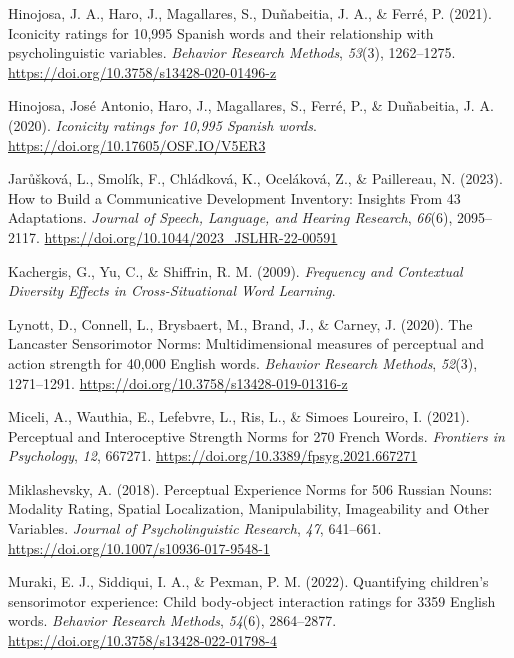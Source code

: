 \documentclass[
  man,floatsintext]{apa6}
\newlength{\cslhangindent}
\newlength{\cslentryspacingunit} %
\newenvironment{CSLReferences}[2] %
 {%
  \setlength{\parindent}{0pt}
  \ifodd #1
  \let\oldpar\par
  \def\par{\hangindent=\cslhangindent\oldpar}
  \fi
  \setlength{\parskip}{#2\cslentryspacingunit}
 }%
 {}
\begin{document}
\begin{CSLReferences}{1}{0}
\leavevmode{}%
Hinojosa, J. A., Haro, J., Magallares, S., Duñabeitia, J. A., \& Ferré, P. (2021). Iconicity ratings for 10,995 {Spanish} words and their relationship with psycholinguistic variables. \emph{Behavior Research Methods}, \emph{53}(3), 1262--1275. \url{https://doi.org/10.3758/s13428-020-01496-z}

\leavevmode{}%
Hinojosa, José Antonio, Haro, J., Magallares, S., Ferré, P., \& Duñabeitia, J. A. (2020). \emph{Iconicity ratings for 10,995 {Spanish} words}. \url{https://doi.org/10.17605/OSF.IO/V5ER3}

\leavevmode{}%
Jarůšková, L., Smolík, F., Chládková, K., Oceláková, Z., \& Paillereau, N. (2023). How to {Build} a {Communicative Development Inventory}: {Insights From} 43 {Adaptations}. \emph{Journal of Speech, Language, and Hearing Research}, \emph{66}(6), 2095--2117. \url{https://doi.org/10.1044/2023_JSLHR-22-00591}

\leavevmode{}%
Kachergis, G., Yu, C., \& Shiffrin, R. M. (2009). \emph{Frequency and {Contextual Diversity Effects} in {Cross-Situational Word Learning}}.

\leavevmode{}%
Lynott, D., Connell, L., Brysbaert, M., Brand, J., \& Carney, J. (2020). The {Lancaster Sensorimotor Norms}: Multidimensional measures of perceptual and action strength for 40,000 {English} words. \emph{Behavior Research Methods}, \emph{52}(3), 1271--1291. \url{https://doi.org/10.3758/s13428-019-01316-z}

\leavevmode{}%
Miceli, A., Wauthia, E., Lefebvre, L., Ris, L., \& Simoes Loureiro, I. (2021). Perceptual and {Interoceptive Strength Norms} for 270 {French Words}. \emph{Frontiers in Psychology}, \emph{12}, 667271. \url{https://doi.org/10.3389/fpsyg.2021.667271}

\leavevmode{}%
Miklashevsky, A. (2018). Perceptual {Experience Norms} for 506 {Russian Nouns}: {Modality Rating}, {Spatial Localization}, {Manipulability}, {Imageability} and {Other Variables}. \emph{Journal of Psycholinguistic Research}, \emph{47}, 641--661. \url{https://doi.org/10.1007/s10936-017-9548-1}

\leavevmode{}%
Muraki, E. J., Siddiqui, I. A., \& Pexman, P. M. (2022). Quantifying children's sensorimotor experience: {Child} body-object interaction ratings for 3359 {English} words. \emph{Behavior Research Methods}, \emph{54}(6), 2864--2877. \url{https://doi.org/10.3758/s13428-022-01798-4}


\end{CSLReferences}
\end{document}

